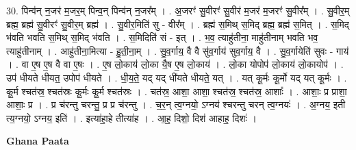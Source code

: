 \documentclass[17pt]{extarticle}
\begin{document}
30. पिन्व॑न् न॒जर॑ म॒जर॒म् पिन्व॒न् पिन्व॑न् न॒जर᳚म् । . अ॒जरꣳ॑ सु॒वीरꣳ॑ सु॒वीर॑ म॒जर॑ म॒जरꣳ॑ सु॒वीर᳚म् । . सु॒वीर॒म् ब्रह्म॒ ब्रह्म॑ सु॒वीरꣳ॑ सु॒वीर॒म् ब्रह्म॑ । . सु॒वीर॒मिति॑ सु - वीर᳚म् । . ब्रह्म॑ स॒मिथ् स॒मिद् ब्रह्म॒ ब्रह्म॑ स॒मित् । . स॒मिद् भ॑वति भवति स॒मिथ् स॒मिद् भ॑वति । . स॒मिदिति॑ सं - इत् । . भ॒व॒ त्याहु॑तीना॒ माहु॑तीनाम् भवति भव॒ त्याहु॑तीनाम् । . आहु॑तीना॒मित्या - हु॒ती॒ना॒म् । . सु॒व॒र्गाय॒ वै वै सु॑व॒र्गाय॑ सुव॒र्गाय॒ वै । . सु॒व॒र्गायेति॑ सुवः - गाय॑ । . वा ए॒ष ए॒ष वै वा ए॒षः । . ए॒ष लो॒काय॑ लो॒का यै॒ष ए॒ष लो॒काय॑ । . लो॒का योपोप॑ लो॒काय॑ लो॒कायोप॑ । . उप॑ धीयते धीयत॒ उपोप॑ धीयते । . धी॒य॒ते॒ यद् यद् धी॑यते धीयते॒ यत् । . यत् कू॒र्मः कू॒र्मो यद् यत् कू॒र्मः । . कू॒र्म श्चत॑स्र॒ श्चत॑स्रः कू॒र्मः कू॒र्म श्चत॑स्रः । . चत॑स्र॒ आशा॒ आशा॒ श्चत॑स्र॒ श्चत॑स्र॒ आशाः᳚ । . आशाः॒ प्र प्राशा॒ आशाः॒ प्र । . प्र च॑रन्तु चरन्तु॒ प्र प्र च॑रन्तु । . च॒र॒न् त्व॒ग्नयो॒ ऽग्नय॑ श्चरन्तु चरन् त्व॒ग्नयः॑ । . अ॒ग्नय॒ इती त्य॒ग्नयो॒ ऽग्नय॒ इति॑ । . इत्या॑हा॒हे तीत्या॑ह । . आ॒ह॒ दिशो॒ दिश॑ आहाह॒ दिशः॑ । \newline

\textbf{Ghana Paata } \newline
\end{document}
